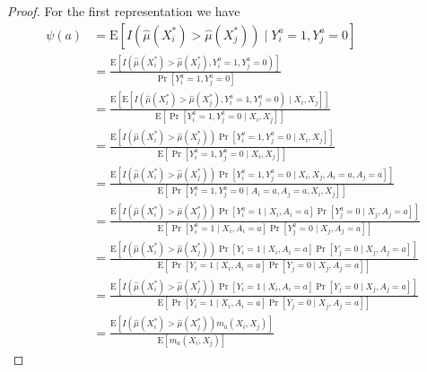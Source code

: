 \begin{proof}
    For the first representation we have 
$$
\begin{aligned}
 \psi(a)&= \mathrm{E}\left[I\left(\widehat{\mu}(X_i^*)>\widehat{\mu}(X_j^*)\right) \mid Y^a_i=1, Y^a_j=0\right] \\
&= \frac{\mathrm{E}\left[I\left(\widehat{\mu}(X_i^*)>\widehat{\mu}(X_j^*), Y^a_i=1, Y^a_j=0\right)\right]}{\operatorname{Pr}\left[Y^a_i=1, Y^a_j=0\right]} \\
&= \frac{\mathrm{E}\left[\mathrm{E}\left[I\left(\widehat{\mu}(X_i^*)>\widehat{\mu}(X_j^*), Y^a_i=1, Y^a_j=0\right) \mid X_i, X_j\right]\right]}{\mathrm{E}\left[\operatorname{Pr}\left[Y^a_i=1, Y^a_j=0 \mid X_i, X_j\right]\right]} \\
&= \frac{\mathrm{E}\left[I\left(\widehat{\mu}(X_i^*)>\widehat{\mu}(X_j^*)\right) \operatorname{Pr}\left[Y^a_i=1, Y^a_j=0  \mid X_i, X_j\right]\right]}{\mathrm{E}\left[\operatorname{Pr}\left[Y^a_i=1, Y^a_j=0  \mid X_i, X_j\right]\right]} \\
&= \frac{\mathrm{E}\left[I\left(\widehat{\mu}(X_i^*)>\widehat{\mu}(X_j^*)\right) \operatorname{Pr}\left[Y^a_i=1, Y^a_j=0  \mid X_i, X_j, A_i = a, A_j = a\right]\right]}{\mathrm{E}\left[\operatorname{Pr}\left[Y^a_i=1, Y^a_j=0  \mid A_i = a, A_j = a, X_i, X_j\right]\right]} \\
&= \frac{\mathrm{E}\left[I\left(\widehat{\mu}(X_i^*)>\widehat{\mu}(X_j^*)\right) \operatorname{Pr}\left[Y^a_i=1 \mid X_i,A_i = a\right] \Pr\left[ Y^a_j=0 \mid X_j, A_j = a\right]\right]}{\mathrm{E}\left[\operatorname{Pr}\left[Y^a_i=1 \mid X_i,A_i = a\right] \Pr\left[ Y^a_j=0 \mid X_j, A_j = a\right]\right]} \\
&= \frac{\mathrm{E}\left[I\left(\widehat{\mu}(X_i^*)>\widehat{\mu}(X_j^*)\right) \operatorname{Pr}\left[Y_i=1 \mid X_i,A_i = a\right] \Pr\left[ Y_j=0 \mid X_j, A_j = a\right]\right]}{\mathrm{E}\left[\operatorname{Pr}\left[Y_i=1 \mid X_i,A_i = a\right] \Pr\left[ Y_j=0 \mid X_j, A_j = a\right]\right]} \\
&= \frac{\mathrm{E}\left[I\left(\widehat{\mu}(X_i^*)>\widehat{\mu}(X_j^*)\right) \operatorname{Pr}\left[Y_i=1 \mid X_i,A_i = a\right] \Pr\left[ Y_j=0 \mid X_j, A_j = a\right]\right]}{\mathrm{E}\left[\operatorname{Pr}\left[Y_i=1 \mid X_i,A_i = a\right] \Pr\left[ Y_j=0 \mid X_j, A_j = a\right]\right]} \\
&= \frac{\mathrm{E}\left[I\left(\widehat{\mu}(X_i^*)>\widehat{\mu}(X_j^*)\right)m_a(X_i, X_j) \right]}{\mathrm{E}\left[m_a(X_i, X_j) \right]}
\end{aligned}
$$


\end{proof}
